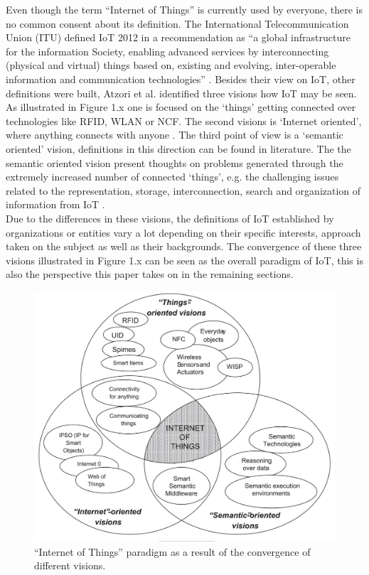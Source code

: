 Even though the term ``Internet of Things'' is currently used by everyone, there is no common consent about its definition. The International Telecommunication Union (ITU) defined IoT 2012 in a recommendation as ``a global infrastructure for the information Society, enabling advanced services by interconnecting (physical and virtual) things based on, existing and evolving, inter-operable information and communication technologies'' \cite{itu}. Besides their view on IoT, other definitions were built, Atzori et al. identified three visions how IoT may be seen. As illustrated in Figure 1.x one is focused on the `things' getting connected over technologies like RFID, WLAN or NCF. The second visions is `Internet oriented', where anything connects with anyone . The third point of view is a `semantic oriented' vision, definitions in this direction can be found in literature. The the semantic oriented vision present thoughts on problems generated through the extremely increased number of connected `things', e.g. the challenging issues related to the representation, storage, interconnection, search and organization of information from IoT \cite{atzori}.\\
Due to the differences in these visions, the definitions of IoT established by organizations or entities vary a lot depending on their specific interests, approach taken on the subject as well as their backgrounds. The convergence of these three visions illustrated in Figure 1.x can be seen as the overall paradigm of IoT, this is also the perspective this paper takes  on in the remaining sections. 
  \begin{figure}[h]
    \begin{center}
    \includegraphics[scale=0.35]{Talk11/iot_visions.jpg}
    \end{center}
    \caption{``Internet of Things'' paradigm as a result of the convergence of different visions.}
    \label{``Internet of Things'' visions}
  \end{figure}

